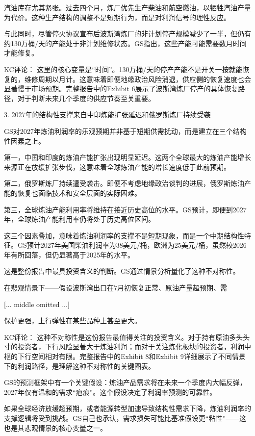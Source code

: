\documentclass[11pt]{ctexart}
\begin{document}
汽油库存尤其紧张。过去四个月，炼厂优先生产柴油和航空燃油，以牺牲汽油产量为代价。这种生产结构的调整不是短期行为，而是对利润信号的理性反应。

与此同时，尽管停火协议宣布后波斯湾炼厂的非计划停产规模减少了一半，但仍有约130万桶/天的产能处于非计划维修状态。GS指出，这些产能可能需要数月时间才能修复。

KC评论： 这里的核心变量是“时间”。130万桶/天的停产产能不是开关一按就能恢复的，维修周期以月计。这意味着即便地缘政治风险消退，供应侧的恢复速度也会显著慢于市场预期。完整报告中的Exhibit 6展示了波斯湾炼厂停产的具体恢复路径，对于判断未来几个季度的供应节奏至关重要。

3. 2027年的结构性支撑来自中印炼能扩张延迟和俄罗斯炼厂持续受袭

GS对2027年炼油利润率的乐观预期并非基于短期供需扰动，而是建立在三个结构性因素之上。

第一，中国和印度的炼油产能扩张出现明显延迟。这两个全球最大的炼油产能增长来源正在放缓扩张步伐，这意味着全球炼油产能的增长速度低于此前预期。

第二，俄罗斯炼厂持续遭受袭击。即便不考虑地缘政治谈判的进展，俄罗斯炼油产能的恢复也面临技术和安全层面的实际困难。

第三，全球炼油产能利用率将维持在接近历史高位的水平。GS预计，即便到2027年，全球炼油产能利用率仍将处于历史高位区间。

这三个因素叠加，意味着炼油利润率的支撑不是短期现象，而是一个中期结构性特征。GS预计2027年美国柴油利润率为38美元/桶，欧洲为25美元/桶，虽然较2026年有所回落，但仍显著高于2025年的水平。

这是整份报告中最具投资含义的判断。GS通过情景分析量化了这种不对称性。

在悲观情景下——假设波斯湾出口在7月初恢复正常、原油产量超预期、需

[... middle omitted ...]

保护更强，上行弹性在某些品种上甚至更大。

KC评论： 这种不对称性是这份报告最值得关注的投资含义。对于持有原油多头头寸的投资者，下行风险显著大于炼油利润；而对于关注炼化板块的投资者，利润中枢的下行空间相对有限。完整报告中的Exhibit 8和Exhibit 9详细展示了不同情景下的利润路径，是理解这种不对称性的关键图表。

GS的预测框架中有一个关键假设：炼油产品需求将在未来一个季度内大幅反弹，2027年仅有温和的需求“疤痕”。这个假设决定了利润率预测的可靠性。

如果全球经济放缓超预期，或者能源转型加速导致结构性需求下降，炼油利润率的支撑逻辑将受到挑战。GS自己也承认，需求损失可能比基准假设更“粘性”——这也是其悲观情景的核心变量之一。
\end{document}
